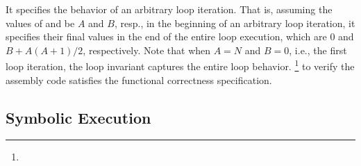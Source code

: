 It specifies the behavior of an arbitrary loop iteration.
That is, assuming the values of  and  be $A$ and $B$, resp., in the beginning of an arbitrary loop iteration, it specifies their final values in the end of the entire loop execution, which are 0 and $B + A(A+1)/2$, respectively.
Note that when $A = N$ and $B = 0$, i.e., the first loop iteration, the loop invariant captures the entire loop behavior.
%
%
\footnote{%
} to verify the  assembly code satisfies the functional correctness specification.




\subsection{Symbolic Execution}
\label{sec:Appl:Security}

